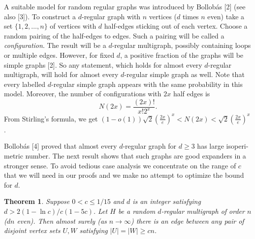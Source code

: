 \documentclass[12pt,a4paper]{article}
\newtheorem{theorem}{Theorem}
\begin{document}
A suitable model for random regular graphs was introduced by Bollob\'as [2]
(see also [3]). To construct a $d$-regular graph with $n$ vertices ($d$ times $n$ even)
take a set $\{1,2,\ldots,n\}$ of vertices with $d$ half-edges sticking out of each vertex.
Choose a random pairing of the half-edges to edges. Such a pairing will be called a
\emph{configuration}. The result will be a $d$-regular multigraph, possibly containing loops or
multiple edges. However, for fixed $d$, a positive fraction of the graphs will be simple
graphs [2]. So any statement, which holds for almost every $d$-regular multigraph,
will hold for almost every $d$-regular simple graph as well. Note that every labelled
$d$-regular simple graph appears with the same probability in this model. Moreover,
the number of configurations with $2x$ half edges is
\[
  N(2x)=\frac{(2x)!}{x!2^x}.
\]
From Stirling's formula, we get $(1-o(1))\sqrt{2}\left(\frac{2x}{e}\right)^x<N(2x)<\sqrt{2}\left(\frac{2x}{e}\right)^x$.

Bollob\'as [4] proved that almost every $d$-regular graph for $d\ge 3$ has large isoperi-
metric number. The next result shows that such graphs are good expanders in a
stronger sense. To avoid tedious case analysis we concentrate on the range of $c$ that
we will need in our proofs and we make no attempt to optimize the bound for $d$.

\begin{theorem}
Suppose $0<c\le 1/15$ and $d$ is an integer satisfying $d>2(1-\ln c)/c(1-5c)$. Let $H$ be a random $d$-regular multigraph of order $n$ ($dn$ even).
Then almost surely (as $n\to\infty$) there is an edge between any pair of disjoint vertex
sets $U,W$ satisfying $|U|=|W|\ge cn$.
\end{theorem}
\end{document}
